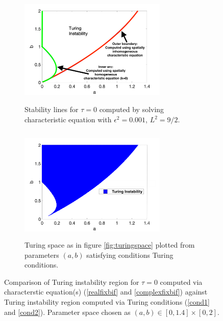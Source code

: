 \begin{figure}[H]
    \centering
    \begin{subfigure}[b]{0.47\textwidth}
        \centering
        \includegraphics[width=7cm,height = 5.5cm]{bif0.png}
        \caption{Stability lines for $\tau=0$ computed by solving characteristic equation with $\epsilon^2=0.001$, $L^2=9/2$.}
        \label{fig:bif0}
    \end{subfigure}
    \hfill
    \begin{subfigure}[b]{0.47\textwidth}
        \centering
        \includegraphics[width=7cm,height = 5.5cm]{turingspace.png}
        \caption{Turing space as in figure \ref{fig:turingspace} plotted from parameters $(a,b)$ satisfying conditions Turing conditions.}
        \label{}
    \end{subfigure}
    \caption{Comparison of Turing instability region for $\tau=0$ computed via characterstic equation(s) (\eqref{realfixbif} and \eqref{complexfixbif}) against Turing instability region computed via Turing conditions (\eqref{cond1} and \eqref{cond2}). Parameter space chosen as $(a,b)\in[0,1.4]\times[0,2]$.}
    \label{fig:tspace1}
\end{figure}

